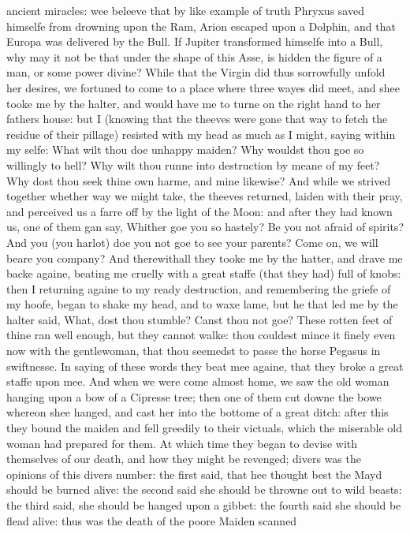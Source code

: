 ancient miracles: wee beleeve that by like example of truth Phryxus saved
himselfe from drowning upon the Ram, Arion escaped upon a Dolphin, and that
Europa was delivered by the Bull. If Jupiter transformed himselfe into a Bull,
why may it not be that under the shape of this Asse, is hidden the figure of a
man, or some power divine? While that the Virgin did thus sorrowfully unfold
her desires, we fortuned to come to a place where three wayes did meet, and
shee tooke me by the halter, and would have me to turne on the right hand to
her fathers house: but I (knowing that the theeves were gone that way to fetch
the residue of their pillage) resisted with my head as much as I might, saying
within my selfe: What wilt thou doe unhappy maiden? Why wouldst thou goe so
willingly to hell? Why wilt thou runne into destruction by meane of my feet?
Why dost thou seek thine own harme, and mine likewise? And while we strived
together whether way we might take, the theeves returned, laiden with their
pray, and perceived us a farre off by the light of the Moon: and after they had
known us, one of them gan say, Whither goe you so hastely? Be you not afraid of
spirits? And you (you harlot) doe you not goe to see your parents? Come on, we
will beare you company? And therewithall they tooke me by the hatter, and drave
me backe againe, beating me cruelly with a great staffe (that they had) full of
knobs: then I returning againe to my ready destruction, and remembering the
griefe of my hoofe, began to shake my head, and to waxe lame, but he that led
me by the halter said, What, dost thou stumble? Canst thou not goe? These
rotten feet of thine ran well enough, but they cannot walke: thou couldest
mince it finely even now with the gentlewoman, that thou seemedst to passe the
horse Pegasus in swiftnesse. In saying of these words they beat mee againe,
that they broke a great staffe upon mee. And when we were come almost home, we
saw the old woman hanging upon a bow of a Cipresse tree; then one of them cut
downe the bowe whereon shee hanged, and cast her into the bottome of a great
ditch: after this they bound the maiden and fell greedily to their victuals,
which the miserable old woman had prepared for them. At which time they began
to devise with themselves of our death, and how they might be revenged; divers
was the opinions of this divers number: the first said, that hee thought best
the Mayd should be burned alive: the second said she should be throwne out to
wild beasts: the third said, she should be hanged upon a gibbet: the fourth
said she should be flead alive: thus was the death of the poore Maiden scanned
